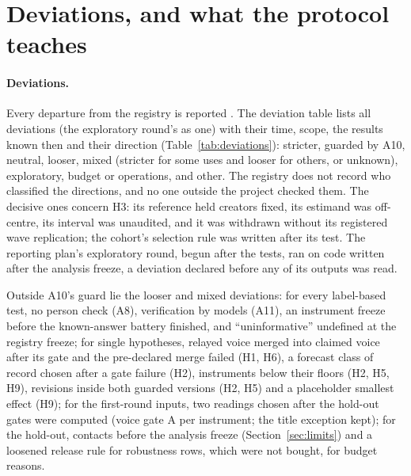 
\section{Deviations, and what the protocol teaches}
\label{sec:deviations}

\paragraph{Deviations.} Every departure from the registry is reported \cite{willroth2024best}. The deviation table lists all \NDeviationRows{} deviations (the exploratory round's
\NDevRoundRows{} as one) with their time, scope, the results known then and their direction
(Table~\ref{tab:deviations}): \NDevStricter{} stricter,
\NDevGuarded{} guarded by A10, \NDevNeutral{} neutral, \NDevLooser{} looser, \NDevMixed{} mixed (stricter for some uses
and looser for others, or unknown), \NDevExploratory{} exploratory, \NDevBudget{} budget or operations, and
\NDevOther{} other. The registry does not record who classified the directions, and no one outside the project checked
them. The decisive ones concern H3: its reference held creators fixed, its estimand was off-centre, its interval was
unaudited, and it was withdrawn without its registered wave replication; the cohort's selection rule was written after
its test. The reporting plan's exploratory round, begun after the tests, ran on code written after the analysis
freeze, a deviation declared before any of its outputs was read.

Outside A10's guard lie the looser and mixed deviations: for every label-based test, no person check (A8),
verification by models (A11), an instrument freeze before the known-answer battery finished, and
``uninformative'' undefined at the registry freeze; for single hypotheses, relayed voice merged into claimed voice
after its gate and the pre-declared merge failed (H1, H6), a forecast class of record chosen after a gate failure (H2), instruments below their
floors (H2, H5, H9), revisions inside both guarded versions (H2, H5) and a placeholder smallest effect (H9); for the
first-round inputs, two readings chosen after the hold-out gates were computed (voice gate A per instrument; the title
exception kept); for the hold-out, contacts before the analysis freeze (Section~\ref{sec:limits}) and a loosened release rule for robustness
rows, which were not bought, for budget reasons.

